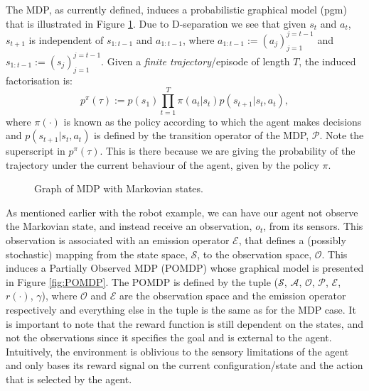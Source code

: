 \documentclass{report}
\numberwithin{equation}{section}
\numberwithin{figure}{section}
\numberwithin{table}{section}
\numberwithin{algorithm}{section}
\begin{document}
The MDP, as currently defined, induces a probabilistic graphical model 
(pgm) that is illustrated in Figure \ref{fig:MDP}. Due to D-separation 
we see that given $s_t$ and  $a_t$, $s_{t+1}$ is independent of 
$s_{1:t-1}$ and $a_{1:t-1}$, where $a_{1:t-1}:=(a_j)_{j=1}^{j=t-1}$ 
and $s_{1:t-1}:=(s_j)_{j=1}^{j=t-1}$.
Given a \textit{finite trajectory}/episode of length $T$, the induced 
factorisation is:
\begin{equation}
  p^{\pi}(\tau):=p(s_1)\prod_{t=1}^T \pi(a_t|s_t)p(s_{t+1}|s_t,a_t),
\end{equation}
where $\pi(\cdot)$ is known as the policy according to which the 
agent makes decisions and $p(s_{t+1}|s_t, a_t)$ is defined by the 
transition operator of the MDP, $\mathcal{P}$. Note the superscript 
in $p^{\pi}(\tau)$. This is there because we are giving the probability 
of the trajectory under the current behaviour of the agent, given 
by the policy $\pi$.

\begin{figure}[H]
  \centering
  \caption{\label{fig:MDP} Graph of MDP with Markovian states.}
\end{figure}

As mentioned earlier with the robot example, we can have our agent 
not observe the Markovian state, and instead receive an observation, 
$o_t$, from its sensors. This observation is associated with 
an emission operator $\mathcal{E}$, that defines a (possibly stochastic) 
mapping from the state space, $\mathcal{S}$, to the observation 
space, $\mathcal{O}$. This induces a Partially Observed MDP (POMDP) 
whose graphical model is presented in Figure \ref{fig:POMDP}. The 
POMDP is defined by the tuple ($\mathcal{S}$, $\mathcal{A}$, 
$\mathcal{O}$, $\mathcal{P}$, $\mathcal{E}$, $r(\cdot)$, $\gamma$), 
where $\mathcal{O}$ and $\mathcal{E}$ are the observation space and 
the emission operator respectively and everything else in the tuple 
is the same as for the MDP case. It is important to note that the 
reward function is still dependent on the states, and not the observations 
since it specifies the goal and is external to the agent. Intuitively, 
the environment is oblivious to the sensory limitations of the agent 
and only bases its reward signal on the current configuration/state and 
the action that is selected by the agent.
\end{document}
